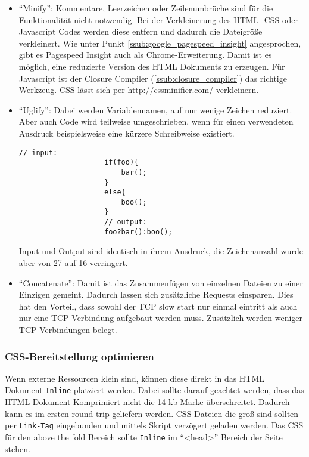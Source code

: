 				\begin{itemize}
					\item "`Minify"': Kommentare, Leerzeichen oder Zeilenumbrüche sind für die Funktionalität nicht notwendig. Bei der Verkleinerung des HTML- CSS oder Javascript Codes werden diese entfern und dadurch die Dateigröße verkleinert. Wie unter Punkt \ref{ssub:google_pagespeed_insight} angesprochen, gibt es Pagespeed Insight auch als Chrome-Erweiterung. Damit ist es möglich, eine reduzierte Version des HTML Dokuments zu erzeugen. Für Javascript ist der Closure Compiler (\ref{ssub:closure_compiler}) das richtige Werkzeug. CSS lässt sich per \url{http://cssminifier.com/} verkleinern.
					\item "`Uglify"': Dabei werden Variablennamen, auf nur wenige Zeichen reduziert. Aber auch Code wird teilweise umgeschrieben, wenn für einen verwendeten Ausdruck beispielsweise eine kürzere Schreibweise existiert.

					\begin{lstlisting}[captionpos=b, caption=Beispiel: Uglify eines Ausdrucks, label=lst:uglify]
					// input:
					if(foo){
						bar();
					}
					else{
						boo();
					}
					// output:
					foo?bar():boo();
					\end{lstlisting}

					Input und Output sind identisch in ihrem Ausdruck, die Zeichenanzahl wurde aber von 27 auf 16 verringert.

					\item "`Concatenate"': Damit ist das Zusammenfügen von einzelnen Dateien zu einer Einzigen gemeint. Dadurch lassen sich zusätzliche Requests einsparen. Dies hat den Vorteil, dass sowohl der TCP slow start nur einmal eintritt als auch nur eine TCP Verbindung aufgebaut werden muss. Zusätzlich werden weniger TCP Verbindungen belegt.
				\end{itemize}

			\subsubsection{CSS-Bereitstellung optimieren} %
			\label{ssub:css_bereitstellung_optimieren}
				Wenn externe Ressourcen klein sind, können diese direkt in das HTML Dokument \texttt{Inline} platziert werden. Dabei sollte darauf geachtet werden, dass das HTML Dokument Komprimiert nicht die 14 kb Marke überschreitet. Dadurch kann es im ersten round trip geliefern werden. CSS Dateien die groß sind sollten per \texttt{Link-Tag} eingebunden und mittels Skript verzögert geladen werden. Das CSS für den above the fold Bereich sollte \texttt{Inline} im "`<head>"' Bereich der Seite stehen. 

